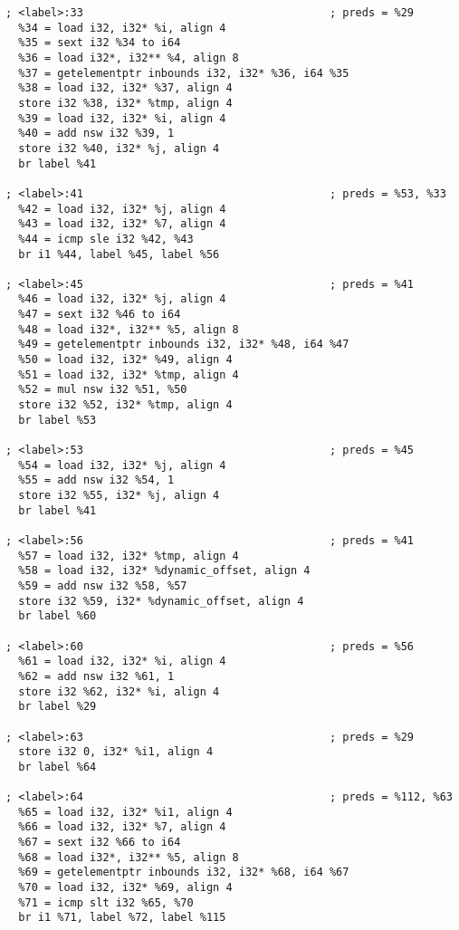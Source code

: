\begin{verbatim}
; <label>:33                                      ; preds = %29
  %34 = load i32, i32* %i, align 4
  %35 = sext i32 %34 to i64
  %36 = load i32*, i32** %4, align 8
  %37 = getelementptr inbounds i32, i32* %36, i64 %35
  %38 = load i32, i32* %37, align 4
  store i32 %38, i32* %tmp, align 4
  %39 = load i32, i32* %i, align 4
  %40 = add nsw i32 %39, 1
  store i32 %40, i32* %j, align 4
  br label %41

; <label>:41                                      ; preds = %53, %33
  %42 = load i32, i32* %j, align 4
  %43 = load i32, i32* %7, align 4
  %44 = icmp sle i32 %42, %43
  br i1 %44, label %45, label %56

; <label>:45                                      ; preds = %41
  %46 = load i32, i32* %j, align 4
  %47 = sext i32 %46 to i64
  %48 = load i32*, i32** %5, align 8
  %49 = getelementptr inbounds i32, i32* %48, i64 %47
  %50 = load i32, i32* %49, align 4
  %51 = load i32, i32* %tmp, align 4
  %52 = mul nsw i32 %51, %50
  store i32 %52, i32* %tmp, align 4
  br label %53

; <label>:53                                      ; preds = %45
  %54 = load i32, i32* %j, align 4
  %55 = add nsw i32 %54, 1
  store i32 %55, i32* %j, align 4
  br label %41

; <label>:56                                      ; preds = %41
  %57 = load i32, i32* %tmp, align 4
  %58 = load i32, i32* %dynamic_offset, align 4
  %59 = add nsw i32 %58, %57
  store i32 %59, i32* %dynamic_offset, align 4
  br label %60

; <label>:60                                      ; preds = %56
  %61 = load i32, i32* %i, align 4
  %62 = add nsw i32 %61, 1
  store i32 %62, i32* %i, align 4
  br label %29

; <label>:63                                      ; preds = %29
  store i32 0, i32* %i1, align 4
  br label %64

; <label>:64                                      ; preds = %112, %63
  %65 = load i32, i32* %i1, align 4
  %66 = load i32, i32* %7, align 4
  %67 = sext i32 %66 to i64
  %68 = load i32*, i32** %5, align 8
  %69 = getelementptr inbounds i32, i32* %68, i64 %67
  %70 = load i32, i32* %69, align 4
  %71 = icmp slt i32 %65, %70
  br i1 %71, label %72, label %115


\end{verbatim}
